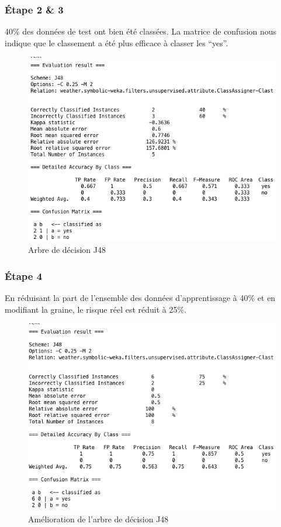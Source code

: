 \documentclass[a4paper,12pt]{article}
\begin{document}
\subsubsection*{\'Etape 2 \& 3}
40\% des données de test ont bien été classées.
La matrice de confusion nous indique que le classement a été plus efficace à classer les \enquote{yes}.
\begin{figure}
	\center
	\includegraphics[width=1\textwidth]{arbre-1.png}
	\caption{Arbre de décision J48}
	\label{fig:arbre-1}
\end{figure}

\subsubsection*{\'Etape 4}
En réduisant la part de l’ensemble des données d’apprentissage à 40\% et en modifiant la graine, le risque réel est réduit à 25\%.
\begin{figure}
	\center
	\includegraphics[width=1\textwidth]{arbre-2.png}
	\caption{Amélioration de l'arbre de décision J48}
	\label{fig:arbre-2}
\end{figure}
\end{document}
